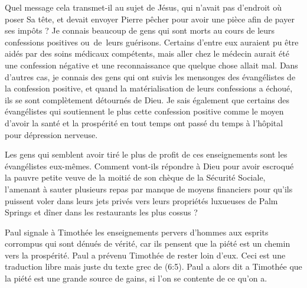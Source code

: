 Quel message cela transmet-il au sujet de Jésus, qui n'avait pas
 d'endroit où poser Sa tête, et devait envoyer Pierre pêcher
 pour avoir une pièce afin de payer ses impôts ? Je connais beaucoup de gens
 qui sont morts au cours de leurs confessions positives ou~de~leurs guérisons.
 Certains d'entre eux auraient pu être aidés par des soins médicaux
 compétents, mais aller chez le médecin aurait été une confession négative
 et une reconnaissance que quelque chose allait mal.
 Dans d'autres cas, je connais des gens qui ont suivis les mensonges
 des évangélistes de la confession positive, et quand la matérialisation
 de leurs confessions a échoué, ils se sont complètement détournés de Dieu.
 Je sais également que certains des évangélistes qui soutiennent
 le plus cette confession positive comme le moyen d'avoir la santé
 et la prospérité en tout temps ont passé du temps à l'hôpital
 pour dépression nerveuse.

Les gens qui semblent avoir tiré le plus de profit de ces enseignements
 sont les évangélistes eux-mêmes. Comment vont-ils répondre à Dieu
 pour avoir escroqué la pauvre petite veuve de la moitié de son chèque
 de la Sécurité Sociale, l'amenant à sauter plusieurs repas par manque
 de moyens financiers pour qu'ils puissent voler dans leurs jets privés
 vers leurs propriétés luxueuses de Palm Springs et dîner dans les
 restaurants les plus cossus ?

Paul signale à Timothée les enseignements pervers
 d'hom\-mes aux esprits corrompus qui sont dénués de vérité, car ils pensent
 que la piété est un chemin vers la prospérité.
 Paul a prévenu Timothée de rester loin d'eux.
 Ceci est une traduction libre mais juste du texte grec
 de (6:5).
 Paul a alors dit a Timothée que la piété est une grande source de gains,
 si l'on se contente de ce qu'on a.
\closechapter

